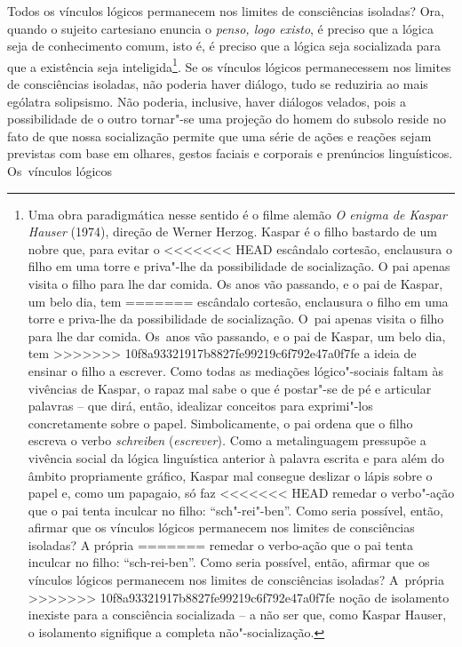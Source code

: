 {{Todos os vínculos lógicos permanecem nos limites de consciências
isoladas? Ora, quando o sujeito cartesiano enuncia o \emph{penso, logo
existo}, é preciso que a lógica seja de conhecimento comum, isto é, é
preciso que a lógica seja socializada para que a existência seja
inteligida\footnote{Uma obra paradigmática nesse sentido é o filme
  alemão \emph{O enigma de Kaspar Hauser} (1974), direção de Werner
  Herzog. Kaspar é o filho bastardo de um nobre que, para evitar o
<<<<<<< HEAD
  escândalo cortesão, enclausura o filho em uma torre e priva"-lhe da
  possibilidade de socialização. O pai apenas visita o filho para lhe
  dar comida. Os anos vão passando, e o pai de Kaspar, um belo dia, tem
=======
  escândalo cortesão, enclausura o filho em uma torre e priva-lhe da
  possibilidade de socialização. O~pai apenas visita o filho para lhe
  dar comida. Os~anos vão passando, e o pai de Kaspar, um belo dia, tem
>>>>>>> 10f8a93321917b8827fe99219c6f792e47a0f7fe
  a ideia de ensinar o filho a escrever. Como todas as mediações
  lógico"-sociais faltam às vivências de Kaspar, o rapaz mal sabe o que é
  postar"-se de pé e articular palavras -- que dirá, então, idealizar
  conceitos para exprimi"-los concretamente sobre o papel.
  Simbolicamente, o pai ordena que o filho escreva o verbo
  \emph{schreiben} (\emph{escrever})\emph{.} Como a metalinguagem
  pressupõe a vivência social da lógica linguística anterior à palavra
  escrita e para além do âmbito propriamente gráfico, Kaspar mal
  consegue deslizar o lápis sobre o papel e, como um papagaio, só faz
<<<<<<< HEAD
  remedar o verbo"-ação que o pai tenta inculcar no filho:
  ``sch"-rei"-ben''. Como seria possível, então, afirmar que os vínculos
  lógicos permanecem nos limites de consciências isoladas? A própria
=======
  remedar o verbo-ação que o pai tenta inculcar no filho:
  ``sch-rei-ben''. Como seria possível, então, afirmar que os vínculos
  lógicos permanecem nos limites de consciências isoladas? A~própria
>>>>>>> 10f8a93321917b8827fe99219c6f792e47a0f7fe
  noção de isolamento inexiste para a consciência socializada -- a não
  ser que, como Kaspar Hauser, o isolamento signifique a completa
  não"-socialização.}. Se os vínculos lógicos permanecessem nos limites
de consciências isoladas, não poderia haver diálogo, tudo se reduziria
ao mais ególatra solipsismo. Não poderia, inclusive, haver diálogos
velados, pois a possibilidade de o outro tornar"-se uma projeção do homem
do subsolo reside no fato de que nossa socialização permite que uma
série de ações e reações sejam previstas com base em olhares, gestos
faciais e corporais e prenúncios linguísticos. Os~vínculos lógicos
}}
